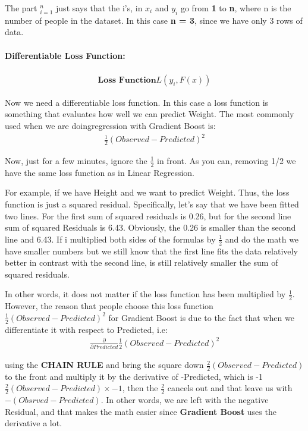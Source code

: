\documentclass[12pt, a4paper]{article} %
\begin{document}
The part $^n_{i = 1}$ just says that the i's, in $x_{i}$ and $y_{i}$ go from \textbf{1} to \textbf{n}, where n is the number of people in the dataset. In this case \textbf{n = 3}, since we have only 3 rows of data.


\paragraph{Differentiable Loss Function:}
\begin{align*}
    \textbf{Loss Function} L(y_{i}, F(x))
\end{align*}

Now we need a differentiable loss function. In this case a loss function is something that evaluates how well we can predict Weight. The most commonly used when we are doing\fe regression with Gradient Boost is:
\begin{align*}
    \frac{1}{2}(Observed - Predicted)^2
\end{align*}

Now, just for a few minutes, ignore the $\frac{1}{2}$ in front. As you can, removing 1/2 we have the same loss function as in Linear Regression.

For example, if we have Height and we want to predict Weight. Thus, the loss function is just a squared residual. Specifically, let's say that we have been fitted two lines. For the first sum of squared residuals is 0.26, but for the second line sum of squared Residuals is 6.43. Obviously, the 0.26 is smaller than the second line and 6.43. If i multiplied both sides of the formulas by $\frac{1}{2}$ and do the math we have smaller numbers but we still know that the first line fits the data relatively better in contrast with the second line, is still relatively smaller the sum of squared residuals.

In other words, it does not matter if the loss function has been multiplied by $\frac{1}{2}$.
However, the reason that people choose this loss function $\frac{1}{2}(Observed - Predicted)^2$ for Gradient Boost is due to the fact that when we differentiate it with respect to Predicted, i.e:
\begin{align*}
    \frac{\partial}{\partial Predicted} \frac{1}{2}(Observed - Predicted)^2
\end{align*}

using the \textbf{CHAIN RULE} and bring the square down $\frac{2}{2}(Observed - Predicted)$ to the front and multiply it by the derivative of -Predicted, which is -1 $\frac{2}{2}(Observed - Predicted) \times -1$, then the $\frac{2}{2}$ cancels out and that leave us with $-(Obsrved - Predicted)$. In other words, we are left with the negative Residual, and that makes the math easier since \textbf{Gradient Boost} uses the derivative a lot.
\end{document}
